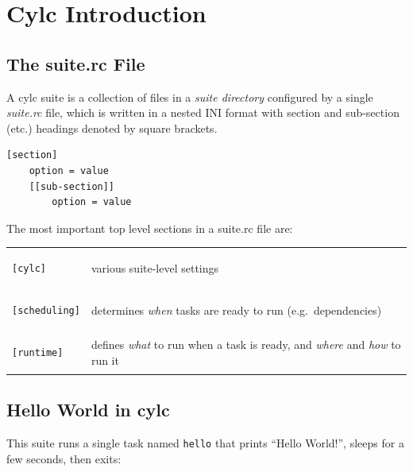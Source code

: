 \section{Cylc Introduction}
\label{Cylc Introduction}


\subsection{The suite.rc File}

A cylc suite is a collection of files in a {\em suite directory} configured by
a single {\em suite.rc} file, which is written in a nested INI format with
section and sub-section (etc.) headings denoted by square brackets.

\begin{lstlisting}[language=suiterc]
[section]
    option = value
    [[sub-section]]
        option = value
\end{lstlisting}

The most important top level sections in a suite.rc file are:

\begin{tabular}{ll}
\begin{lstlisting}
[cylc]
\end{lstlisting} & various suite-level settings\\
\begin{lstlisting}
[scheduling]
\end{lstlisting} & determines {\em when} tasks are ready to run (e.g.\ dependencies)\\
\begin{lstlisting}
[runtime]
\end{lstlisting} & defines {\em what} to run when a task is ready, and
{\em where} and {\em how} to run it \\
\end{tabular}


\subsection{Hello World in cylc}
\label{Hello World in cylc}
This suite runs a single task named \lstinline{hello} that prints ``Hello
World!'', sleeps for a few seconds, then exits:


